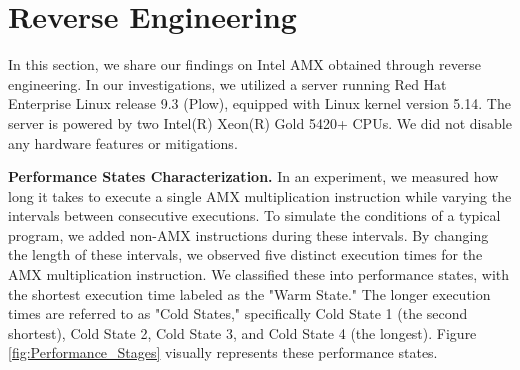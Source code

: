 \section{Reverse Engineering}
In this section, we share our findings on Intel AMX obtained through reverse engineering. In our investigations, we utilized a server running Red Hat Enterprise Linux release 9.3 (Plow), equipped with Linux kernel version 5.14. The server is powered by two Intel(R) Xeon(R) Gold 5420+ CPUs. 
We did not disable any hardware features or mitigations.

\textbf{Performance States Characterization.} 
In an experiment, we measured how long it takes to execute a single AMX multiplication instruction while varying the intervals between consecutive executions. To simulate the conditions of a typical program, we added non-AMX instructions during these intervals. By changing the length of these intervals, we observed five distinct execution times for the AMX multiplication instruction. We classified these into performance states, with the shortest execution time labeled as the "Warm State." The longer execution times are referred to as "Cold States," specifically Cold State 1 (the second shortest), Cold State 2, Cold State 3, and Cold State 4 (the longest).  Figure \ref{fig:Performance_Stages} visually represents these performance states. 


